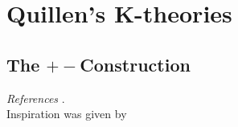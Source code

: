 
















\chapter{Quillen's K-theories}

\section{The $+-$Construction}
\textit{References} \cite{srinivasAlgebraicKTheory1996,weibelKbookIntroductionAlgebraic2013a}.\\
Inspiration was given by \cite{kervaireSmoothHomologySpheres1969}\\

